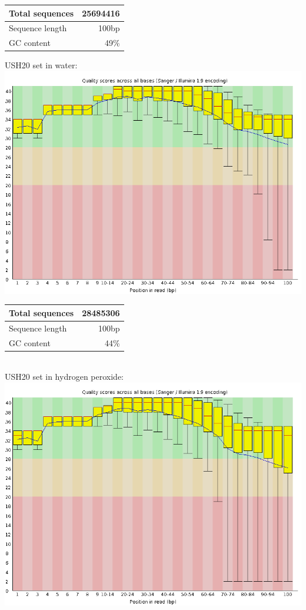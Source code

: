 \documentclass{article}
\begin{document}
	\begin{tabular}{| l | r |}
	\hline
	Total sequences & 25694416 \\ \hline
	Sequence length & 100bp \\ \hline
	GC content & 49\% \\ \hline
	\end{tabular} \linebreak
\newpage
USH20 set in water: \\
\includegraphics[scale=0.3]{ush20_h20_r1_basequal.png} \\
	\begin{tabular}{| l | r |}
	\hline
	Total sequences & 28485306 \\ \hline
	Sequence length & 100bp \\ \hline
	GC content & 44\% \\ \hline
	\end{tabular} \linebreak
\\
USH20 set in hydrogen peroxide: \\
\includegraphics[scale=0.3]{ush20_h202_r1_basequal.png} \\
\end{document}
